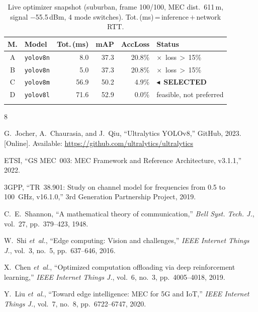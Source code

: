 \documentclass[10pt,conference]{IEEEtran}
\begin{document}
\begin{table}[b]
\centering
\caption{%
  Live optimizer snapshot (suburban, frame 100/100, MEC dist.\ 611\,m,
  signal $-$55.5\,dBm, 4 mode switches).
  Tot.\,(ms)\,=\,inference\,$+$\,network RTT.%
}
\label{tab:live}
\renewcommand{\arraystretch}{0.95}
\setlength{\tabcolsep}{3pt}
\scriptsize
\begin{tabular}{@{} c l r r r l @{}}
\Xhline{2\arrayrulewidth}
\textbf{M.} & \textbf{Model} &
  \textbf{Tot.\,(ms)} & \textbf{mAP} & \textbf{AccLoss} &
  \textbf{Status} \\
\hline
A & \texttt{yolov8n} &  8.0 & 37.3 & 20.8\% & $\times$\ loss\,$>$\,15\% \\
B & \texttt{yolov8n} &  5.0 & 37.3 & 20.8\% & $\times$\ loss\,$>$\,15\% \\
\rowcolor{gray!15}
C & \texttt{yolov8m} & 56.9 & 50.2 &  4.9\% &
  $\blacktriangleleft$\ \textbf{SELECTED} \\
D & \texttt{yolov8l} & 71.6 & 52.9 &  0.0\% & feasible, not preferred \\
\Xhline{2\arrayrulewidth}
\end{tabular}
\end{table}

\begin{thebibliography}{8}

G.~Jocher, A.~Chaurasia, and J.~Qiu,
``Ultralytics YOLOv8,'' GitHub, 2023.
[Online]. Available: \url{https://github.com/ultralytics/ultralytics}

ETSI,
``GS MEC~003: MEC Framework and Reference Architecture, v3.1.1,'' 2022.

3GPP,
``TR~38.901: Study on channel model for frequencies from 0.5 to
100~GHz, v16.1.0,'' 3rd Generation Partnership Project, 2019.

C.~E.~Shannon,
``A mathematical theory of communication,''
\textit{Bell Syst. Tech. J.}, vol.~27, pp.~379--423, 1948.

W.~Shi \textit{et~al.},
``Edge computing: Vision and challenges,''
\textit{IEEE Internet Things J.}, vol.~3, no.~5, pp.~637--646, 2016.

X.~Chen \textit{et~al.},
``Optimized computation offloading via deep reinforcement learning,''
\textit{IEEE Internet Things J.}, vol.~6, no.~3, pp.~4005--4018, 2019.

Y.~Liu \textit{et~al.},
``Toward edge intelligence: MEC for 5G and IoT,''
\textit{IEEE Internet Things J.}, vol.~7, no.~8, pp.~6722--6747, 2020.

\end{thebibliography}
\end{document}
